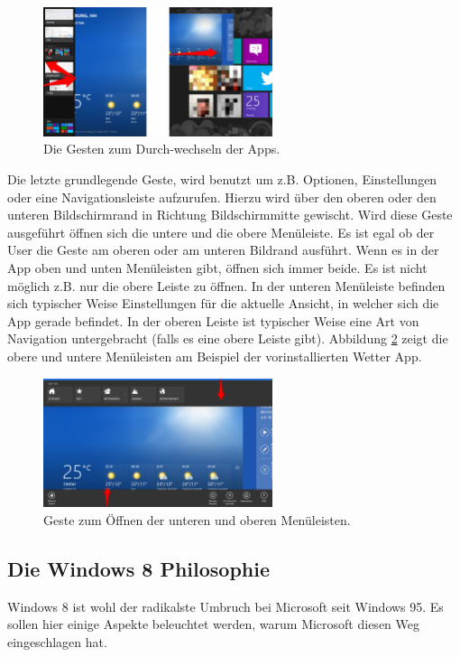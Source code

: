 \documentclass[12pt,a4paper,bibtotoc,abstracton]{scrartcl}
\begin{document}
\begin{figure}[h]	
	\centering
	\includegraphics[width=0.6\textwidth]{Bilder/Screenshots/windows8/apps_changing.png} 
	\caption{Die Gesten zum Durch-wechseln der Apps.}
	\label{fig:appschanging}
\end{figure}  

Die letzte grundlegende Geste, wird benutzt um z.B. Optionen, Einstellungen oder eine Navigationsleiste aufzurufen. Hierzu wird über den oberen oder den unteren Bildschirmrand in Richtung Bildschirmmitte gewischt. Wird diese Geste ausgeführt öffnen sich die untere und die obere Menüleiste. Es ist egal ob der User die Geste am oberen oder am unteren Bildrand ausführt. Wenn es in der App oben und unten Menüleisten gibt, öffnen sich immer beide. Es ist nicht möglich z.B. nur die obere Leiste zu öffnen. In der unteren Menüleiste befinden sich typischer Weise Einstellungen für die aktuelle Ansicht, in welcher sich die App gerade befindet. In der oberen Leiste ist typischer Weise eine Art von Navigation untergebracht (falls es eine obere Leiste gibt). Abbildung \ref{fig:menubar} zeigt die obere und untere Menüleisten am Beispiel der vorinstallierten Wetter App.

\begin{figure}[h]	
	\centering
	\includegraphics[width=0.6\textwidth]{Bilder/Screenshots/windows8/app_leisten.png} 
	\caption{Geste zum Öffnen der unteren und oberen Menüleisten.}
	\label{fig:menubar}
\end{figure}  

\subsection{Die Windows 8 Philosophie}
\label{subsec:win8philosophie}
Windows 8 ist wohl der radikalste Umbruch bei Microsoft seit Windows 95. Es sollen hier einige Aspekte beleuchtet werden, warum Microsoft diesen Weg eingeschlagen hat.
\end{document}
